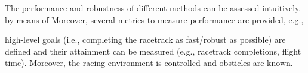 The performance and robustness of different methods 
can be assessed intuitively. 
by means of 
Moreover, several metrics to measure performance are provided,
e.g., 

high-level goals
(i.e., completing the racetrack as fast/robust as possible)
are defined and their 
attainment can be measured (e.g., racetrack completions, flight time).
Moreover, the racing environment is controlled
and obsticles are known.








